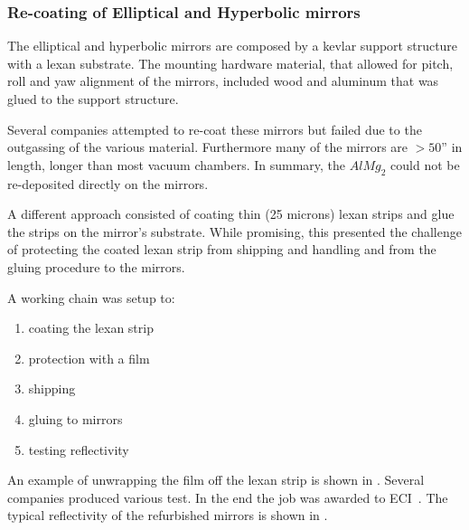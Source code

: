 \subsubsection{Re-coating of Elliptical and Hyperbolic mirrors}

The elliptical and hyperbolic mirrors are composed by a kevlar support structure with a lexan substrate. The mounting hardware
material, that allowed for pitch, roll and yaw alignment of the mirrors, included wood and aluminum that was glued to the support structure.

Several companies attempted to re-coat these mirrors but failed due to the outgassing of the various material. Furthermore many of the mirrors
are $> 50$'' in length, longer than most vacuum chambers. In summary, the $AlMg_2$ could not be re-deposited directly on the mirrors.

A different approach consisted of coating thin (25 microns) lexan strips and glue the strips on the mirror's substrate. While promising, this
presented the challenge of protecting the coated lexan strip from shipping and handling and from the gluing procedure to the mirrors.

A working chain was setup to:

\begin{enumerate}
	\item coating the lexan strip
	\item protection with a film
	\item shipping
	\item gluing to mirrors
	\item testing reflectivity
\end{enumerate}

An example of unwrapping the film off the lexan strip is shown in . Several companies produced various test. In the end the
job was awarded to ECI~\cite{ECI}. The typical reflectivity of the refurbished mirrors is shown in .

